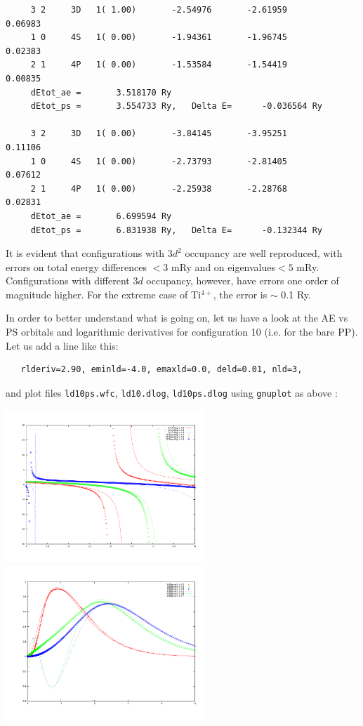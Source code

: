 \documentclass[12pt,a4paper]{article}
\begin{document}
\begin{verbatim}
     3 2     3D   1( 1.00)       -2.54976       -2.61959        0.06983
     1 0     4S   1( 0.00)       -1.94361       -1.96745        0.02383
     2 1     4P   1( 0.00)       -1.53584       -1.54419        0.00835
     dEtot_ae =       3.518170 Ry
     dEtot_ps =       3.554733 Ry,   Delta E=      -0.036564 Ry
 
     3 2     3D   1( 0.00)       -3.84145       -3.95251        0.11106
     1 0     4S   1( 0.00)       -2.73793       -2.81405        0.07612
     2 1     4P   1( 0.00)       -2.25938       -2.28768        0.02831
     dEtot_ae =       6.699594 Ry
     dEtot_ps =       6.831938 Ry,   Delta E=      -0.132344 Ry
\end{verbatim} 
It is evident that configurations with $3d^2$ occupancy are well 
reproduced, with errors on total energy differences $<3$ mRy and
on eigenvalues$<5$ mRy. Configurations with different $3d$ occupancy,
however, have errors one order of magnitude higher. For the extreme
case of Ti$^{4+}$, the error is $\sim$ 0.1 Ry.

In order to better understand what is going on, let us have a
look at the AE vs PS orbitals and logarithmic derivatives for
configuration 10 (i.e. for the bare PP). Let us add a line
like this:
\begin{verbatim}
   rlderiv=2.90, eminld=-4.0, emaxld=0.0, deld=0.01, nld=3,
\end{verbatim}
and plot files \texttt{ld10ps.wfc}, \texttt{ld10.dlog},
\texttt{ld10ps.dlog} using \texttt{gnuplot} as above :

\includegraphics[width=7.5cm]{pseudo-gen-fig3.pdf}
\includegraphics[width=7.5cm]{pseudo-gen-fig4.pdf}
\end{document}
